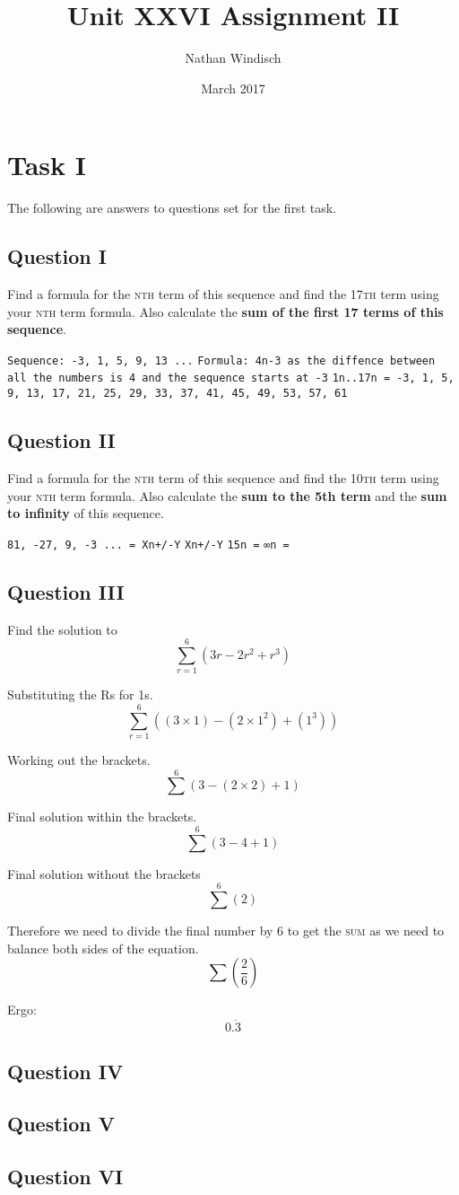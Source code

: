 \documentclass[a4paper,12pt]{article}
\begin{document}
\title{Unit XXVI Assignment II}
\author{Nathan Windisch}
\date{March 2017}
\maketitle
{}
\tableofcontents
\newpage
{}

\section{Task I}
The following are answers to questions set for the first task.
\subsection{Question I}
Find a formula for the \textsc{nth} term of this sequence and find the \textsc{17th} term using your \textsc{nth} term formula. Also calculate the \textbf{sum of the first 17 terms of this sequence}.

\texttt{Sequence: -3, 1, 5, 9, 13 ...}
\texttt{Formula: 4n-3 as the diffence between all the numbers is 4 and the sequence starts at -3}
\texttt{1n..17n = -3, 1, 5, 9, 13, 17, 21, 25, 29, 33, 37, 41, 45, 49, 53, 57, 61}

\newpage

\subsection{Question II}
Find a formula for the \textsc{nth} term of this sequence and find the \textsc{10th} term using your \textsc{nth} term formula. Also calculate the \textbf{sum to the 5th term} and the \textbf{sum to infinity} of this sequence.

\texttt{81, -27, 9, -3 ... = Xn+/-Y}
\texttt{Xn+/-Y}
\texttt{15n =}
\texttt{∞n =}

\newpage

\subsection{Question III}
Find the solution to $$\sum_{r=1}^6 (3r - 2r^2 + r^3)$$

Substituting the Rs for 1s.
$$\sum_{r=1}^6 ((3 \times 1) - (2 \times 1^2) + (1^3))$$

Working out the brackets.
$$\sum^6 (3 - (2 \times 2) + 1)$$

Final solution within the brackets.
$$\sum^6 (3 - 4 + 1)$$

Final solution without the brackets
$$\sum^6 (2)$$

Therefore we need to divide the final number by 6 to get the \textsc{sum} as we need to balance both sides of the equation.
$$\sum (\frac{2}{6})$$

Ergo:
$$0.\dot3$$

\newpage

\subsection{Question IV}

\newpage

\subsection{Question V}

\newpage

\subsection{Question VI}
\end{document}
